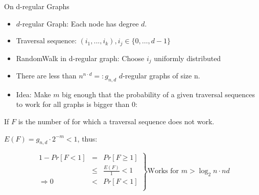 \begin{frame}{On d-regular Graphs}

\begin{itemize}
\item
  $d$-regular Graph: Each node has degree $d$.
\item
  Traversal sequence: $(i_1, ... , i_k), i_j \in \{0, \dots, d-1\}$
\item
  RandomWalk in d-regular graph: Choose $i_j$ uniformly distributed
\item
  There are less than $n^{n \cdot d} =: g_{n,d}$ $d$-regular graphs of
  size n.
\item
  Idea: Make $m$ big enough that the probability of a given traversal
  sequences to work for all graphs is bigger than 0:
\end{itemize}

If $F$ is the number of for which a traversal sequence does not work.

$E(F) = g_{n, d} \cdot 2^{-m} < 1$, thus:

\[
\left.
\begin{array}{rcl}
1 - Pr[F < 1] & = & Pr[F \geq 1] \\
              & \leq & \frac{E(F)}{1} < 1 \\
\Rightarrow 0 & < & Pr[F < 1] \\
\end{array}
\right\}
\text{Works for } m > \log_2 n \cdot nd
\]

\end{frame}
